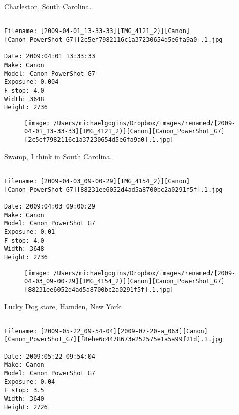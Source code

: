 \documentclass[11pt,letter,DIV=14,paper=landscape]{scrbook}
\begin{document}
\clearpage
\noindent Charleston, South Carolina.
\noindent
\begin{lstlisting}

Filename: [2009-04-01_13-33-33][IMG_4121_2)][Canon][Canon_PowerShot_G7][2c5ef7982116c1a37230654d5e6fa9a0].1.jpg

Date: 2009:04:01 13:33:33
Make: Canon
Model: Canon PowerShot G7
Exposure: 0.004
F stop: 4.0
Width: 3648
Height: 2736
\end{lstlisting}
\clearpage

\begin{figure}
\texttt{[image: /Users/michaelgogins/Dropbox/images/renamed/[2009-04-01\_13-33-33][IMG\_4121\_2)][Canon][Canon\_PowerShot\_G7][2c5ef7982116c1a37230654d5e6fa9a0].1.jpg]}
\end{figure}
    
\clearpage
\noindent Swamp, I think in South Carolina.
\noindent
\begin{lstlisting}

Filename: [2009-04-03_09-00-29][IMG_4154_2)][Canon][Canon_PowerShot_G7][88231ee6052d4ad5a8700bc2a0291f5f].1.jpg

Date: 2009:04:03 09:00:29
Make: Canon
Model: Canon PowerShot G7
Exposure: 0.01
F stop: 4.0
Width: 3648
Height: 2736
\end{lstlisting}
\clearpage

\begin{figure}
\texttt{[image: /Users/michaelgogins/Dropbox/images/renamed/[2009-04-03\_09-00-29][IMG\_4154\_2)][Canon][Canon\_PowerShot\_G7][88231ee6052d4ad5a8700bc2a0291f5f].1.jpg]}
\end{figure}
    
\clearpage
\noindent Lucky Dog store, Hamden, New York.
\noindent
\begin{lstlisting}

Filename: [2009-05-22_09-54-04][2009-07-20-a_063][Canon][Canon_PowerShot_G7][f8ebe6c4478673e252575e1a5a99f21d].1.jpg

Date: 2009:05:22 09:54:04
Make: Canon
Model: Canon PowerShot G7
Exposure: 0.04
F stop: 3.5
Width: 3640
Height: 2726
\end{lstlisting}
\clearpage
\end{document}
